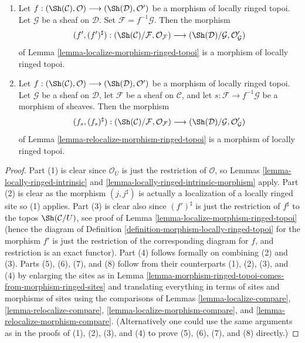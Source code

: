 \begin{lemma}
\begin{enumerate}
on $\mathcal{C}$. Then the morphism
$$
(j, j^\sharp) :
(\Sh(\mathcal{C})/\mathcal{G}, \mathcal{O}_\mathcal{G})
\longrightarrow
(\Sh(\mathcal{C})/\mathcal{F}, \mathcal{O}_\mathcal{F})
$$
of
Lemma \ref{lemma-relocalize-ringed-topos}
is a morphism of locally ringed topoi.
\item Let
$f :
(\Sh(\mathcal{C}), \mathcal{O})
\longrightarrow
(\Sh(\mathcal{D}), \mathcal{O}')$
be a morphism of locally ringed topoi. Let $\mathcal{G}$ be a sheaf
on $\mathcal{D}$. Set $\mathcal{F} = f^{-1}\mathcal{G}$.
Then the morphism
$$
(f', (f')^\sharp) :
(\Sh(\mathcal{C})/\mathcal{F}, \mathcal{O}_\mathcal{F})
\longrightarrow
(\Sh(\mathcal{D})/\mathcal{G}, \mathcal{O}'_\mathcal{G})
$$
of
Lemma \ref{lemma-localize-morphism-ringed-topoi}
is a morphism of locally ringed topoi.
\item  Let
$f :
(\Sh(\mathcal{C}), \mathcal{O})
\longrightarrow
(\Sh(\mathcal{D}), \mathcal{O}')$
be a morphism of locally ringed topoi. Let $\mathcal{G}$ be a sheaf
on $\mathcal{D}$, let $\mathcal{F}$ be a sheaf on $\mathcal{C}$, and
let $s : \mathcal{F} \to f^{-1}\mathcal{G}$ be a morphism of sheaves.
Then the morphism
$$
(f_s, (f_s)^\sharp) :
(\Sh(\mathcal{C})/\mathcal{F}, \mathcal{O}_\mathcal{F})
\longrightarrow
(\Sh(\mathcal{D})/\mathcal{G}, \mathcal{O}'_\mathcal{G})
$$
of
Lemma \ref{lemma-relocalize-morphism-ringed-topoi}
is a morphism of locally ringed topoi.
\end{enumerate}
\end{lemma}

\begin{proof}
Part (1) is clear since $\mathcal{O}_U$ is just the
restriction of $\mathcal{O}$, so
Lemmas \ref{lemma-locally-ringed-intrinsic} and
\ref{lemma-locally-ringed-intrinsic-morphism}
apply. Part (2) is clear as the morphism $(j, j^\sharp)$
is actually a localization of a locally ringed site so (1) applies.
Part (3) is clear also since $(f')^\sharp$ is just the
restriction of $f^\sharp$ to the topos
$\Sh(\mathcal{C}/U)$, see proof of
Lemma \ref{lemma-localize-morphism-ringed-topoi}
(hence the diagram of
Definition \ref{definition-morphism-locally-ringed-topoi}
for the morphism $f'$ is just the restriction of the corresponding
diagram for $f$, and restriction is an exact functor).
Part (4) follows formally on combining (2) and (3).
Parts (5), (6), (7), and (8) follow from their counterparts
(1), (2), (3), and (4) by enlarging the sites as in
Lemma \ref{lemma-morphism-ringed-topoi-comes-from-morphism-ringed-sites}
and translating everything in terms of sites and morphisms of sites using
the comparisons of
Lemmas \ref{lemma-localize-compare},
\ref{lemma-relocalize-compare},
\ref{lemma-localize-morphism-compare}, and
\ref{lemma-relocalize-morphism-compare}.
(Alternatively one could use the same arguments as in the proofs
of (1), (2), (3), and (4) to prove (5), (6), (7), and (8) directly.)
\end{proof}






